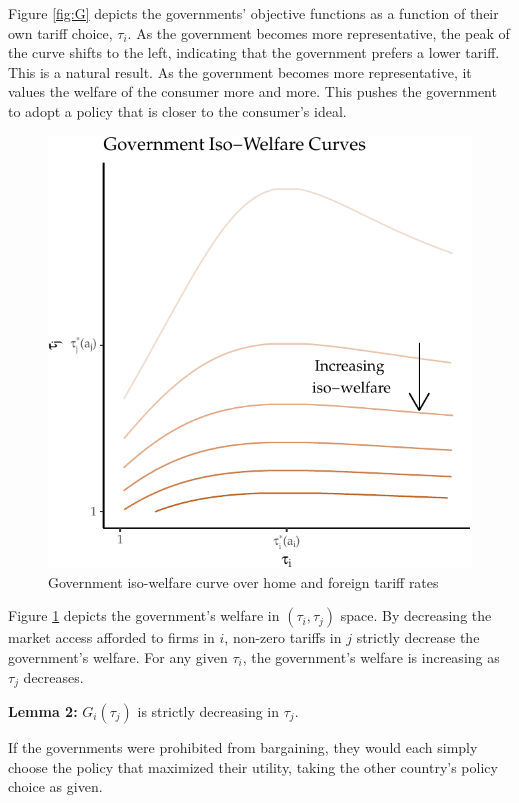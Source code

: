 \documentclass{puthesis}
\begin{document}
Figure \ref{fig:G} depicts the governments' objective functions as a
function of their own tariff choice, \(\tau_i\). As the government
becomes more representative, the peak of the curve shifts to the left,
indicating that the government prefers a lower tariff. This is a natural
result. As the government becomes more representative, it values the
welfare of the consumer more and more. This pushes the government to
adopt a policy that is closer to the consumer's ideal.

\begin{figure}
\centering
\includegraphics{figure/iso-1.pdf}
\caption{Government iso-welfare curve over home and foreign tariff rates
\label{fig:iso}}
\end{figure}

Figure \ref{fig:iso} depicts the government's welfare in
\(\left( \tau_i, \tau_j \right)\) space. By decreasing the market access
afforded to firms in \(i\), non-zero tariffs in \(j\) strictly decrease
the government's welfare. For any given \(\tau_i\), the government's
welfare is increasing as \(\tau_j\) decreases.

\textbf{Lemma 2:} \(G_i(\tau_j)\) is strictly decreasing in \(\tau_j\).

If the governments were prohibited from bargaining, they would each
simply choose the policy that maximized their utility, taking the other
country's policy choice as given.
\end{document}
